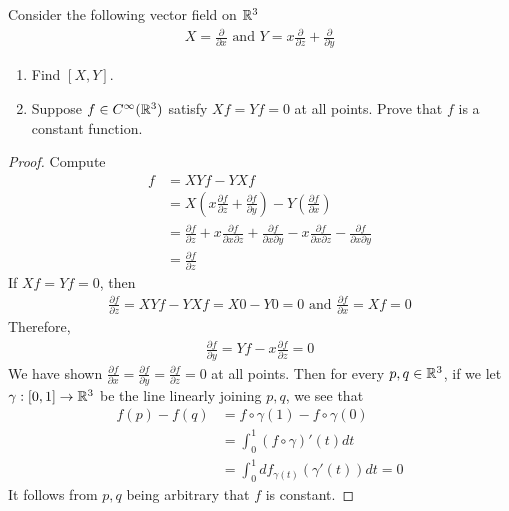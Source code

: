 \documentclass{report}
\begin{document}
\begin{question}{}{}
Consider the following vector field on  $\mathbb{R}^3$ 
 \begin{align*}
X= \frac{\partial }{\partial x} \text{ and }Y=x \frac{\partial }{\partial z}+\frac{\partial }{\partial y}
\end{align*}
\begin{enumerate}[label=(\alph*)]
  \item Find $[X,Y]$. 
  \item Suppose $f\in C^{\infty}(\mathbb{R}^3)$ satisfy $Xf=Yf=0$ at all points. Prove that  $f$ is a constant function. 
\end{enumerate} 
\end{question}
\begin{proof}
Compute 
\begin{align*}
[X,Y]f&= XYf -YXf\\
&=X(x \frac{\partial f}{\partial z}+ \frac{\partial f}{\partial y})- Y(\frac{\partial f}{\partial x})\\
&=\frac{\partial f}{\partial z}+x \frac{\partial f}{\partial x\partial z}+ \frac{\partial f}{\partial x\partial y}-x \frac{\partial f}{\partial x\partial z}-  \frac{\partial f}{\partial x \partial y} \\
&=\frac{\partial f}{\partial z}
\end{align*}
If $Xf=Yf=0$, then 
 \begin{align*}
\frac{\partial f}{\partial z}= XYf-YXf=X0-Y0=0\text{ and }\frac{\partial f}{\partial x}= Xf=0
\end{align*}
Therefore,
\begin{align*}
  \frac{\partial f}{\partial y}=Yf- x \frac{\partial f}{\partial z}=0
\end{align*}
We have shown  $\frac{\partial f}{\partial x}=\frac{\partial f}{\partial y}=\frac{\partial f}{\partial z}=0$ at all points. Then for every $p,q\in\mathbb{R}^3$, if we let $\gamma :[0,1]\rightarrow \mathbb{R}^3$ be the line linearly joining $p,q$, we see that 
\begin{align*}
f(p)-f(q)&=f\circ \gamma (1)-f\circ \gamma (0)\\
&=\int_0^1 (f\circ \gamma )'(t)dt \\
&=\int_0^1 df_{\gamma (t)}(\gamma '(t))dt =0
\end{align*}
It follows from $p,q$ being arbitrary that  $f$ is constant. 
\end{proof}
\end{document}
